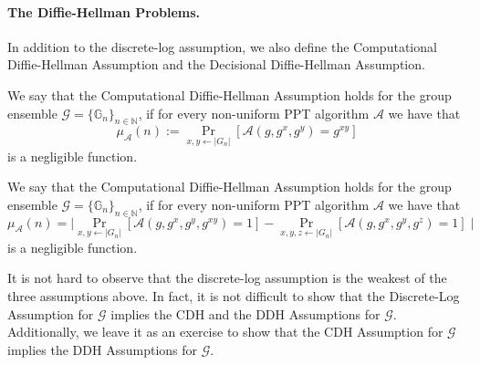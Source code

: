 \documentclass[12pt]{tufte-book}
\begin{document}
\paragraph{The Diffie-Hellman Problems.} In addition to the discrete-log assumption, we also define the Computational Diffie-Hellman Assumption and the Decisional Diffie-Hellman Assumption. 

\begin{definition}\label{def:cdh}
We say that the Computational Diffie-Hellman Assumption holds for the group ensemble $\mathcal{G} =\{ \mathbb{G}_n\}_{n \in \mathbb{N}}$, if for every non-uniform PPT algorithm $\mathcal{A}$ we have that
\[\mu_\mathcal{A}(n) := \Pr_{x,y \leftarrow |G_n|}[\mathcal{A}(g,g^x,g^y) = g^{xy}]\]
is a negligible function.
\end{definition}

\begin{definition}\label{def:ddh}
We say that the Computational Diffie-Hellman Assumption holds for the group ensemble $\mathcal{G} =\{ \mathbb{G}_n\}_{n \in \mathbb{N}}$, if for every non-uniform PPT algorithm $\mathcal{A}$ we have that
\[\mu_\mathcal{A}(n) = \mid\Pr_{x,y \leftarrow |G_n|}[\mathcal{A}(g,g^x,g^y,g^{xy}) = 1] - \Pr_{x,y,z \leftarrow |G_n|}[\mathcal{A}(g,g^x,g^y,g^{z}) = 1]\mid\]
is a negligible function.
\end{definition}

It is not hard to observe that the discrete-log assumption is the weakest of the three assumptions above. In fact, it is not difficult to show that the Discrete-Log Assumption for $\mathcal{G}$ implies the CDH and the DDH Assumptions for $\mathcal{G}$.  Additionally, we leave it as an exercise to show that the CDH Assumption for $\mathcal{G}$ implies the  DDH Assumptions for $\mathcal{G}$.
\end{document}
